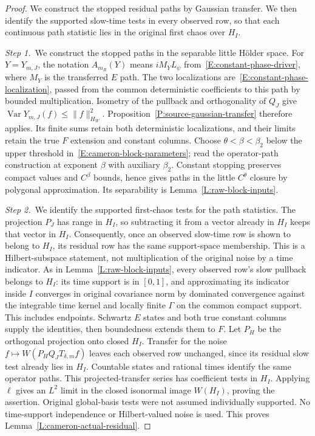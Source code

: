 \begin{proof}
  We construct the stopped residual paths by Gaussian transfer. We then
  identify the supported slow-time tests in every observed row, so that each
  continuous path statistic lies in the original first chaos over $H_I$.


  \medskip
  \noindent\textit{Step 1.~}We construct the stopped paths in the separable
  little Hölder space.
  For $Y=Y_{m,J}$, the notation $A_{m_R}(Y)$ means $iM_YL_\psi$
  from~\eqref{E:constant-phase-driver}, where $M_Y$ is the transferred $E$
  path. The two localizations are~\eqref{E:constant-phase-localization},
  passed from the common deterministic coefficients to this path by bounded
  multiplication.
  Isometry of the pullback and orthogonality of $Q_J$ give
  $\operatorname{Var}Y_{m,J}(f) \le \|f\|_{H_W}^2$.
  Proposition~\ref{P:source-gaussian-transfer} therefore applies. Its finite
  sums retain both deterministic localizations, and their limits retain the true
  $F$ extension and constant columns. Choose $\theta < \beta < \beta_2$ below
  the upper threshold in~\eqref{E:cameron-block-parameters}; read the
  operator-path construction at exponent $\beta$ with auxiliary $\beta_2$.
  Constant stopping preserves compact values and $C^\beta$ bounds, hence gives
  paths in the little $C^\theta$ closure by polygonal approximation. Its
  separability is Lemma~\ref{L:raw-block-inputs}.


  \medskip
  \noindent\textit{Step 2.~}We identify the supported first-chaos tests for
  the path statistics.
  The projection $P_J$ has range in $H_I$, so subtracting it from a vector
  already in $H_I$ keeps that vector in $H_I$. Consequently, once an observed
  slow-time row is shown to belong to $H_I$, its residual row has the same
  support-space membership. This is a Hilbert-subspace statement, not
  multiplication of the original noise by a time indicator.
  As in Lemma~\ref{L:raw-block-inputs}, every observed row's slow pullback
  belongs to $H_I$: its time support is in $[0,1]$, and approximating its
  indicator inside $I$ converges in original covariance norm by dominated
  convergence against the integrable time kernel and locally finite $\Gamma$ on
  the common compact support. This includes endpoints. Schwartz $E$ states and
  both true constant columns supply the identities, then boundedness extends
  them to $F$. Let $P_H$ be the orthogonal projection onto closed $H_I$.
  Transfer for the noise $f\mapsto W(P_HQ_JT_{\delta,m}f)$ leaves each observed
  row unchanged, since its residual slow test already lies in $H_I$. Countable
  states and rational times identify the same operator paths. This
  projected-transfer series has coefficient tests in $H_I$. Applying $\ell$
  gives an $L^2$ limit in the closed isonormal image $W(H_I)$, proving the
  assertion. Original global-basis tests were not assumed individually
  supported. No time-support independence or Hilbert-valued noise is used. This
  proves Lemma~\ref{L:cameron-actual-residual}.
\end{proof}

